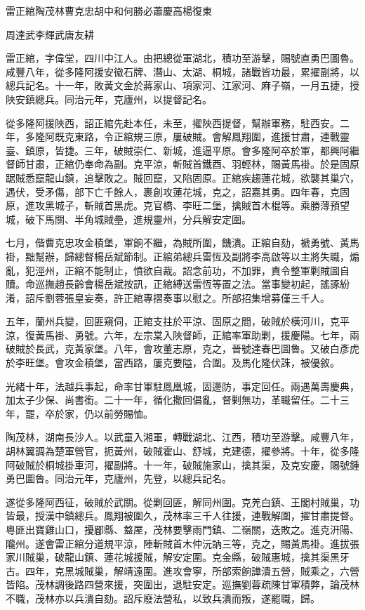 
\begin{pinyinscope}
雷正綰陶茂林曹克忠胡中和何勝必蕭慶高楊復東

周達武李輝武唐友耕

雷正綰，字偉堂，四川中江人。由把總從軍湖北，積功至游擊，賜號直勇巴圖魯。咸豐八年，從多隆阿援安徽石牌、潛山、太湖、桐城，諸戰皆功最，累擢副將，以總兵記名。十一年，敗黃文金於蔣家山、項家河、江家河、麻子嶺，一月五捷，授陜安鎮總兵。同治元年，克廬州，以提督記名。

從多隆阿援陜西，詔正綰先赴本任，未至，擢陜西提督，幫辦軍務，駐西安。二年，多隆阿既克東路，令正綰規三原，屢破賊。會解鳳翔圍，進援甘肅，連戰靈臺、鎮原，皆捷。三年，破賊崇仁、新城，進逼平原。會多隆阿卒於軍，都興阿繼督師甘肅，正綰仍奉命為副。克平涼，斬賊首鐵酉、羽輕林，賜黃馬褂。於是固原踞賊悉竄龍山鎮，追擊敗之。賊回竄，又陷固原。正綰疾趨蓮花城，欲襲其巢穴，遇伏，受矛傷，部下亡千餘人，裹創攻蓮花城，克之，詔嘉其勇。四年春，克固原，進攻黑城子，斬賊首黑虎。克官橋、李旺二堡，擒賊首木棍等。乘勝薄預望城，破下馬關、半角城賊壘，進規靈州，分兵解安定圍。

七月，偕曹克忠攻金積堡，軍餉不繼，為賊所圍，饑潰。正綰自劾，褫勇號、黃馬褂，黜幫辦，歸總督楊岳斌節制。正綰弟總兵雷恆及副將李高啟等以主將失職，煽亂，犯涇州，正綰不能制止，憤欲自裁。詔念前功，不加罪，責令整軍剿賊圖自贖。命巡撫趙長齡會楊岳斌按訊，正綰縛送雷恆等置之法。當事變初起，謠諑紛淆，詔斥劉蓉張皇妄奏，許正綰專摺奏事以慰之。所部招集增募僅三千人。

五年，蘭州兵變，回匪窺伺，正綰支拄於平涼、固原之間，破賊於橫河川，克平涼，復黃馬褂、勇號。六年，左宗棠入陜督師，正綰率軍助剿，援慶陽。七年，兩破賊於長武，克黃家堡。八年，會攻董志原，克之，晉號達春巴圖魯。又破白彥虎於李旺堡。會攻金積堡，當西路，屢克要隘，合圍。及馬化隆伏誅，被優敘。

光緒十年，法越兵事起，命率甘軍駐鳳凰城，固邊防，事定回任。兩遇萬壽慶典，加太子少保、尚書銜。二十一年，循化撒回倡亂，督剿無功，革職留任。二十三年，罷，卒於家，仍以前勞賜恤。

陶茂林，湖南長沙人。以武童入湘軍，轉戰湖北、江西，積功至游擊。咸豐八年，胡林翼調為楚軍營官，扼黃州，破賊霍山、舒城，克建德，擢參將。十年，從多隆阿破賊於桐城掛車河，擢副將。十一年，破賊施家山，擒其渠，及克安慶，賜號鍾勇巴圖魯。同治元年，克廬州，先登，以總兵記名。

遂從多隆阿西征，破賊於武關。從剿回匪，解同州圍。克羌白鎮、王閣村賊巢，功皆最，授漢中鎮總兵。鳳翔被圍久，茂林率三千人往援，連戰解圍，擢甘肅提督。粵匪出寶雞山口，擾郿縣、盩厔，茂林要擊雨門鎮、二嶺關，迭敗之。進克汧陽、隴州。遂會雷正綰分道規平涼，陣斬賊首木仲沅訥三等，克之，賜黃馬褂。進拔張家川賊巢，破龍山鎮、蓮花城援賊，解安定圍。克金縣，破賊惠城，擒其渠黑牙古。四年，克黑城賊巢，解靖遠圍。進攻會寧，所部索餉譁潰五營，賊乘之，六營皆陷。茂林調後路四營來援，突圍出，退駐安定。巡撫劉蓉疏陳甘軍積弊，論茂林不職，茂林亦以兵潰自劾。詔斥廢法營私，以致兵潰而叛，遂罷職，歸。


\end{pinyinscope}
